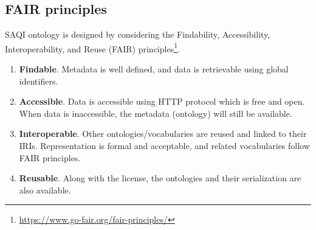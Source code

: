 \subsection{FAIR principles}
SAQI ontology is designed by considering the Findability, Accessibility, Interoperability, and Reuse (FAIR) principles\footnote{\url{https://www.go-fair.org/fair-principles/}}.
\begin{enumerate}
    \item \textbf{Findable}. Metadata is well defined, and data is retrievable using global identifiers.
    \item \textbf{Accessible}. Data is accessible using HTTP protocol which is free and open. When data is inaccessible, the metadata (ontology) will still be available.
    \item \textbf{Interoperable}. Other ontologies/vocabularies are reused and linked to their IRIs. Representation is formal and acceptable, and related vocabularies follow FAIR principles.
    \item \textbf{Reusable}. Along with the license, the ontologies and their serialization are also available.
    
\end{enumerate}
